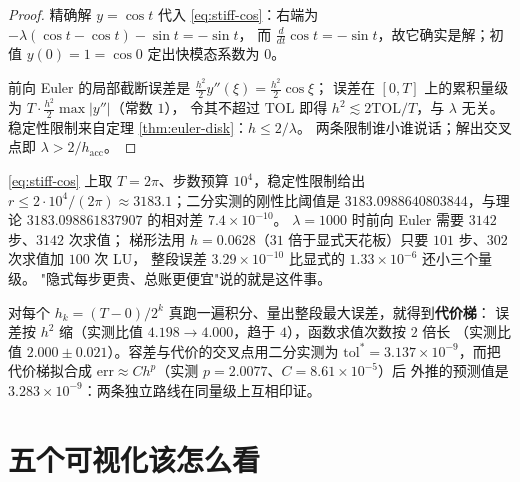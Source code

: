 \begin{proof}
精确解 $y=\cos t$ 代入 \eqref{eq:stiff-cos}：右端为 $-\lambda(\cos t-\cos t)-\sin t=-\sin t$，
而 $\frac{d}{dt}\cos t=-\sin t$，故它确实是解；初值 $y(0)=1=\cos0$ 定出快模态系数为 $0$。

前向 Euler 的局部截断误差是 $\frac{h^2}{2}y''(\xi)=\frac{h^2}{2}\cos\xi$；
误差在 $[0,T]$ 上的累积量级为 $T\cdot\frac{h^2}{2}\max|y''|$（常数 $1$），
令其不超过 $\mathrm{TOL}$ 即得 $h^2\lesssim 2\mathrm{TOL}/T$，与 $\lambda$ 无关。
稳定性限制来自定理 \ref{thm:euler-disk}：$h\le2/\lambda$。
两条限制谁小谁说话；解出交叉点即 $\lambda>2/h_{\text{acc}}$。
\end{proof}

\begin{remark}
\eqref{eq:stiff-cos} 上取 $T=2\pi$、步数预算 $10^4$，稳定性限制给出
$r\le 2\cdot10^4/(2\pi)\approx3183.1$；二分实测的刚性比阈值是
$3183.0988640803844$，与理论 $3183.098861837907$ 的相对差 $7.4\times10^{-10}$。
$\lambda=1000$ 时前向 Euler 需要 $3142$ 步、$3142$ 次求值；
梯形法用 $h=0.0628$（$31$ 倍于显式天花板）只要 $101$ 步、$302$ 次求值加 $100$ 次 LU，
整段误差 $3.29\times10^{-10}$ 比显式的 $1.33\times10^{-6}$ 还小三个量级。
"隐式每步更贵、总账更便宜"说的就是这件事。
\end{remark}

\begin{remark}[精度受限步长是实测出来的]
对每个 $h_k=(T-0)/2^k$ 真跑一遍积分、量出整段最大误差，就得到\textbf{代价梯}：
误差按 $h^2$ 缩（实测比值 $4.198\to4.000$，趋于 $4$），函数求值次数按 $2$ 倍长
（实测比值 $2.000\pm0.021$）。容差与代价的交叉点用二分实测为
$\mathrm{tol}^*=3.137\times10^{-9}$，而把代价梯拟合成
$\mathrm{err}\approx C h^p$（实测 $p=2.0077$、$C=8.61\times10^{-5}$）后
外推的预测值是 $3.283\times10^{-9}$：两条独立路线在同量级上互相印证。
\end{remark}

\section{五个可视化该怎么看}

